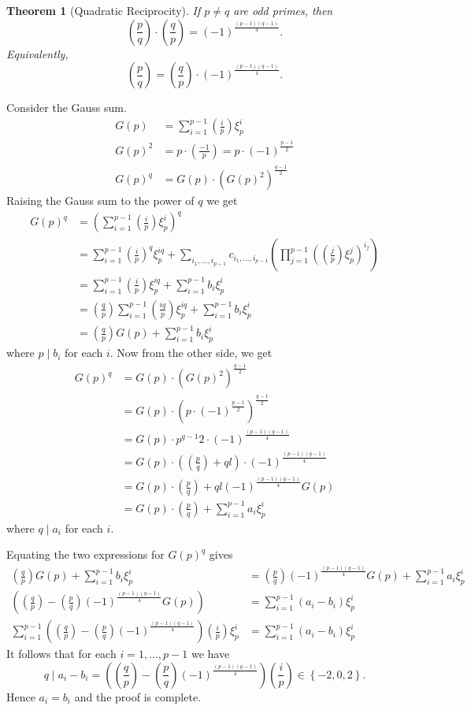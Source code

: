 \documentclass[11pt]{article}
\newtheorem{thm}{Theorem}[section]
\theoremstyle{definition}
\newcommand{\legendre}[2]{\left(\frac{#1}{#2}\right)}
\newcommand{\set}[1]{\left\{ #1 \right\}}
\begin{document}
\begin{thm}[Quadratic Reciprocity]
	If $p\neq q$ are odd primes, then
	$$ \legendre{p}{q} \cdot \legendre{q}{p} = (-1)^{\frac{(p-1)(q-1)}{4}} . $$
	Equivalently, 
	$$ \legendre{p}{q} = \legendre{q}{p} \cdot (-1)^{\frac{(p-1)(q-1)}{4}} . $$
\end{thm}
\proof
	Consider the Gauss sum. 
	\begin{align*}
		G(p) &= \sum_{i=1}^{p-1} \legendre{i}{p} \xi_p^i \\
		G(p)^2 &= p \cdot \legendre{-1}{p} = p\cdot (-1)^\frac{p-1}{2} \\
		G(p)^q &= G(p) \cdot (G(p)^2)^\frac{q-1}{2}
	\end{align*}
	Raising the Gauss sum to the power of $q$ we get
	\begin{align*}
		G(p)^q &= \left( \sum_{i=1}^{p-1} \legendre{i}{p} \xi_p^i \right)^q \\
		&= \sum_{i=1}^{p-1} \legendre{i}{p}^q \xi_p^{iq} 
				+ \sum_{i_1,...,i_{p-1}} c_{i_1,...,i_{p-1}} \left( \prod_{j=1}^{p-1} {\left(\legendre{j}{p} \xi_p^j\right)^{i_j}} \right) \\
		&= \sum_{i=1}^{p-1} \legendre{i}{p} \xi_p^{iq} + \sum_{i=1}^{p-1} b_i \xi_p^i \\
		&= \legendre{q}{p} \sum_{i=1}^{p-1} \legendre{iq}{p} \xi_p^{iq} + \sum_{i=1}^{p-1} b_i \xi_p^i \\
		&= \legendre{q}{p} G(p) + \sum_{i=1}^{p-1} b_i \xi_p^i
	\end{align*}
	where $p\mid b_i$ for each $i$. 
	Now from the other side, we get 
	\begin{align*}
		G(p)^q 
		&= G(p) \cdot (G(p)^2)^\frac{q-1}{2} \\
		&= G(p) \cdot (p \cdot (-1)^\frac{p-1}{2})^\frac{q-1}{2} \\
		&= G(p) \cdot p^{q-1}{2} \cdot (-1)^\frac{(p-1)(q-1)}{4} \\
		&= G(p) \cdot \left( \legendre{p}{q} + ql \right) \cdot (-1)^\frac{(p-1)(q-1)}{4} \\
		&= G(p) \cdot \legendre{p}{q} + ql (-1)^\frac{(p-1)(q-1)}{4} G(p) \\
		&= G(p) \cdot \legendre{p}{q} + \sum_{i=1}^{p-1} a_i \xi_p^i 
	\end{align*}
	where $q \mid a_i$ for each $i$. 

	Equating the two expressions for $G(p)^q$ gives 
	\begin{align*}
		\legendre{q}{p} G(p) + \sum_{i=1}^{p-1} b_i \xi_p^i 
				&= \legendre{p}{q} (-1)^\frac{(p-1)(q-1)}{4} G(p) + \sum_{i=1}^{p-1} a_i \xi_p^i \\
		\left( \legendre{q}{p} - \legendre{p}{q} (-1)^\frac{(p-1)(q-1)}{4} G(p) \right) 
				&= \sum_{i=1}^{p-1} (a_i - b_i) \xi_p^i \\
		\sum_{i=1}^{p-1} \left( \legendre{q}{p} - \legendre{p}{q} (-1)^\frac{(p-1)(q-1)}{4} \right) \legendre{i}{p} \xi_p^i
				&= \sum_{i=1}^{p-1} (a_i - b_i) \xi_p^i
	\end{align*}
	It follows that for each $i = 1,...,p-1$ we have
	$$ q \mid a_i - b_i = \left( \legendre{q}{p} - \legendre{p}{q}(-1)^\frac{(p-1)(q-1)}{4} \right) \legendre{i}{p} \in \set{-2, 0, 2}. $$
	Hence $a_i = b_i$ and the proof is complete.
\qedhere
\end{document}
